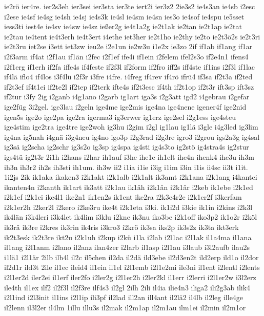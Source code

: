 {ie2rö
ier4re.
ier2s3eh
ier3sei
ier3sta
ier3te
iert2i
ier3z2
2ie3s2
ie4s3an
ie4sb
i2esc
i2ese
ie4sf
ie4sg
ie4sh
ie4sj
ie4s3k
ie4sl
ie4sm
ie4sn
ies3o
ie4sof
ie4spu
ie5sset
iess3ti
iest4e
ie4sv
ie4sw
ie4sz
ießer2g
ie4t1a2g
ie2t1ak
ie2tan
ie2t1ap
ie2tat
ie2tau
ie4tent
ie4t3erh
ie4t3ert
i4ethe
iet3her
ie2t1ho
ie2thy
ie2to
ie2t3ö2s
ie2t3ri
ie2t3ru
iet2se
i3ett
iet3zw
ieu2e
i2e1un
ie2w3u
i1e2x
ie3zo
2if
if1ab
if1ang
if1ar
i2f3arm
if4at
i2f1au
if1än
i2fec
i2f1ef
ife4i
if1ein
i2felem
ifel2s3o
if2e4n1
ifens4
i2f1erg
if1erh
if2fa
iffe4s
if4feste
if2f3l
if2form
if2fro
iff2s
iff4ste
if1ins
i2f3l
if1lac
if4lä
iflo4
if4los
i3f4lü
i2f3r
i3fre
i4fre.
i4freg
if4rev
if4rö
ifrü4
if3sa
if2t3a
if2ted
if2t3ef
if4t1ei
if2te2l
if2tep
if2terk
ifte4s
if2t3esc
if4th
if2t1op
if2t3r
ift3sp
ift3sz
if2tur
i3fy
2ig
i2ganb
i4g1ano
i2garb
ig1art
iga3s
i2g3att
igd2
i4gebrau
i2gefar
ige2füg
3i2gel.
ige3lau
i2geln
ige4me
ige2mis
ige4na
ige4nene
igener4f
ige2nid
igen5s
ige2o
ige2pa
ige2ra
igerma3
ig3erwer
ig1erz
ige2sel
i2g1ess
ige4steu
ige4stim
ige2tra
ige4tre
ige2woh
ig3hu
i2gim
i2gl
ig1lau
ig1lä
i3gle
i4g3led
ig3lim
ig4na
ig5nah
i4gnä
i3g4neu
ig4no
igo3p
i2g3rad
i2g3re
igro3
i2grou
igs2a3g
ig4sal
ig3sä
ig2scha
ig2schr
ig3s2o
ig3sp
ig4spa
ig4sti
ig4s3to
ig2stö
ig4stra4s
ig2stur
igs4tü
ig2t3r
2i1h
i2hans
i2har
ih1auf
i3he
ihe1e
ih1elt
ihe4n
ihenk4
ihe3u
ih3m
ih3n
ih3r2
ih2s
ih3sti
ih1um.
ih3w
ii2
i1ia
i1ie
i3ig
i1im
i3in
i1is
ii4sc
ii3t
i1it.
1i2js
2ik
ik1aka
ikaken3
i2k1akt
i2k1alb
i2k1alt
ik3amt
i2k1ana
i2k1ang
i4kantei
ikanten4n
i2kanth
ik1art
ik3att
i2k1au
ik1äh
i2k1än
i2k1är
i2keb
ik1ebe
i2k1ed
i2k1ef
i2k1ei
ike4l1
ike2n1
ik1en2s
ik1ent
ike2ra
i2k3e4r2e
i2k1er2f
i3kerfam
i2k1er2h
i2ker2l
i2kero
i2ke3ru
ike4t
i2k1eta
i3ki.
ik1i2d
i3kie
ik1in
i2kins
i2k3l
ik4län
i3k4leri
i3k4let
ik4lim
i3klu
i2kne
ik3nu
iko3be
i2k1off
iko3p2
ik1o2r
i2köl
ik3rä
ik3re
i2kres
ik3rin
ik4ris
i3kro3
i2krö
ik3sa
iks2p
ik3s2z
ik3ta
ikt3erk
ik2t3esk
ik2t3re
ikt2u
i2k1uh
i2kup
i2kü
i1la
i2lab
i2l1ac
i2l1ak
il1a4ma
il1ana
il1ang
i2l1anm
i2lano
il2anz
ilan4zer
i2larb
il1asp
i2l1au
i3laub
i3l2aufb
ilau2s
i1lä1
i2l1är
2ilb
ilb4l
il2c
il5chen
il2da
il2dä
ild3ebe
il2d3en2t
ild2erp
ild1o
il2dor
il2d1r
ild3t
2ile
il1ec
ileid4
il1ein
il1el
i2l1emb
i2l1e2mi
ile3ni
il1ent
i2lentl
i2lents
i2l1er2d
iler2ei
il1erf
iler2fo
i2ler2g
i2l1er2h
i2ler2kl
il1err
i2lerri
i2l1er2w
i3l2erz
ile4th
il1ex
ilf2
il2f3l
il2f3re
ilf4s3
il2gl
2ilh
2ili
il4ia
ilie4n3
iliga2
ili2g3ab
ilik4
i2l1ind
i2l3init
il1ins
i2l1ip
ili3pf
il2lad
ill2an
ill4ant
il2lä2
il4lb
il2leg
ille4ge
il2lenn
il3l2er
il4lm
1illu
illu3s
il2mak
il2m1ap
il2m1au
ilm1ei
il2min
il2m1or
}
